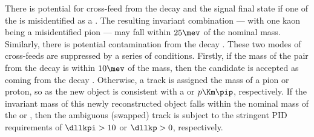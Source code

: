 




There is potential for cross-feed from the decay \decay{\Dp}{\Km\pip\pip} and
the signal \Ds final state if one of the  is misidentified as a \Kp.
The resulting invariant \kkpi combination --- with one kaon being a misidentified pion --- may fall
within $25\mev$ of the nominal \Ds mass.
Similarly, there is potential contamination from the decay .
These two modes of cross-feeds are suppressed by a series of conditions.
Firstly, if the mass of the \kk pair from the \Ds decay is within $10\mev$ of the \phii mass, then
the candidate is accepted as coming from the decay \decay{\Ds}{\kkpi}.
Otherwise, a track is assigned the mass of a pion or proton, so as the new object is consistent
with a \kkpi or $p\Km\pip$, respectively.
If the invariant mass of this newly reconstructed object falls within the nominal mass of the \Dp
or \Lc, then the ambiguous (swapped) track is subject to the stringent PID requirements of
$\dllkpi>10$ or $\dllkp>0$, respectively.







